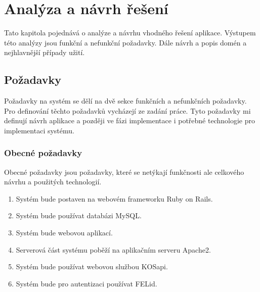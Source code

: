 \chapter{Analýza a návrh řešení}
Tato kapitola pojednává o analýze a návrhu vhodného řešení aplikace. Výstupem této analýzy jsou funkční a nefunkční požadavky. Dále návrh a popis domén a nejhlavnější případy užití. 

\section{Požadavky}
Požadavky na systém se dělí na dvě sekce funkčních a nefunkčních požadavky. Pro definování těchto požadavků vycházejí ze zadání práce. Tyto požadavky mi definují návrh aplikace a později ve fázi implementace i potřebné technologie pro implementaci systému.
\subsection{Obecné požadavky}
Obecné požadavky jsou požadavky, které se netýkají funkčnosti ale celkového návrhu a použitých technologií.
\begin{enumerate}
\item Systém bude postaven na webovém frameworku Ruby on Rails.
\item Systém bude používat databázi MySQL.
\item Systém bude webovou aplikací.
\item Serverová část systému poběží na aplikačním serveru Apache2.
\item Systém bude používat webovou službou KOSapi.
\item Systém bude pro autentizaci používat FELid.
\end{enumerate}

